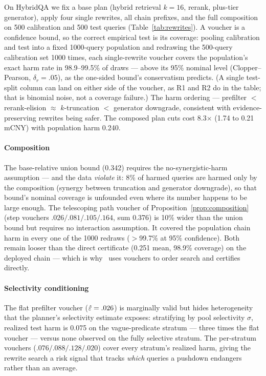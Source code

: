 On HybridQA we fix a base plan (hybrid retrieval $k = 16$, rerank,
plus-tier generator), apply four single rewrites, all chain prefixes,
and the full composition on 500 calibration and 500 test queries
(Table~\ref{tab:rewrites}). A voucher is a confidence bound, so the
correct empirical test is its coverage: pooling calibration and test
into a fixed 1000-query population and redrawing the 500-query
calibration set 1000 times, each single-rewrite voucher covers the
population's exact harm rate in 98.9--99.5\% of draws --- above its
95\% nominal level (Clopper--Pearson, $\delta_r = .05$), as the
one-sided bound's conservatism predicts. (A single test-split column
can land on either side of the voucher, as R1 and R2 do in the table;
that is binomial noise, not a coverage failure.) The harm ordering ---
prefilter $<$ rerank-elision $\approx$ $k$-truncation $<$ generator
downgrade, consistent with evidence-preserving rewrites being safer.
The composed plan cuts cost 8.3$\times$ (1.74 to 0.21
mCNY) with population harm 0.240.

\paragraph{Composition}
The base-relative union bound (0.342) requires the no-synergistic-harm
assumption --- and the data \emph{violate} it: 8\% of harmed queries
are harmed only by the composition (synergy between truncation and
generator downgrade), so that bound's nominal coverage is unfounded
even where its number happens to be large enough. The telescoping path
voucher of Proposition~\ref{prop:composition} (step vouchers
$.026/.081/.105/.164$, sum 0.376) is 10\% wider than the union bound but
requires no interaction assumption. It covered the population chain
harm in every one of the 1000 redraws ($>$99.7\% at
95\% confidence). Both remain looser
than the direct certificate (0.251 mean, 98.9\% coverage) on the
deployed chain --- which is why \system\ uses vouchers to order search
and certifies directly.

\paragraph{Selectivity conditioning}
The flat prefilter voucher ($\hat{\varepsilon} = .026$) is marginally valid but
hides heterogeneity that the planner's selectivity estimate exposes:
stratifying by pool selectivity $\sigma$, realized test harm is 0.075
on the vague-predicate stratum --- three times the flat voucher ---
versus none observed on the fully selective stratum. The per-stratum vouchers
($.076/.088/.128/.020$) cover every stratum's realized harm, giving the
rewrite search a risk signal that tracks \emph{which} queries a
pushdown endangers rather than an average.

